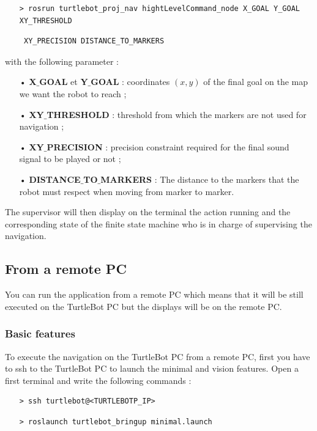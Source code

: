 \documentclass[10pt,a4paper]{article}
\begin{document}
\begin{itemize}
\item[]  \begin{verbatim}> rosrun turtlebot_proj_nav hightLevelCommand_node X_GOAL Y_GOAL XY_THRESHOLD  \end{verbatim}
\item[]  \begin{verbatim} XY_PRECISION DISTANCE_TO_MARKERS \end{verbatim}
\end{itemize}

\noindent with the following parameter : 

\begin{itemize}
\item[•] \textbf{X$\_$GOAL} et \textbf{Y$\_$GOAL} : coordinates $(x,y)$ of the final goal on the map we want the robot to reach ; 
\item[•] \textbf{XY$\_$THRESHOLD} : threshold from which the markers are not used for navigation ; 
\item[•] \textbf{XY$\_$PRECISION} : precision constraint required for the final sound signal to be played or not ; 
\item[•] \textbf{DISTANCE$\_$TO$\_$MARKERS} : The distance to the markers that the robot must respect when moving from marker to marker.
\end{itemize}

The supervisor will then display on the terminal the action running and the corresponding state of the finite state machine who is in charge of supervising the navigation.

\subsection{From a remote PC}

You can run the application from a remote PC which means that it will be still executed on the TurtleBot PC but the displays will be on the remote PC.

\subsubsection{Basic features}

To execute the navigation on the TurtleBot PC from a remote PC, first you have to ssh to the TurtleBot PC to launch the minimal and vision features. Open a first terminal and write the following commands :

\begin{itemize}
\item[]  \begin{verbatim}> ssh turtlebot@<TURTLEBOTP_IP> \end{verbatim}
\item[]  \begin{verbatim}> roslaunch turtlebot_bringup minimal.launch \end{verbatim}
\end{itemize}
\end{document}
